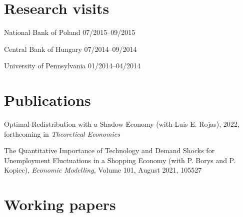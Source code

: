 \documentclass[letterpaper]{article}
\renewenvironment{itemize}{
  \begin{list}{}{
    \setlength{\leftmargin}{1.5em}
  }
}{
  \end{list}
}
\begin{document}
\section*{Research visits}

\begin{itemize}
  \item National Bank of Poland \hfill  07/2015--09/2015
  \item Central Bank of Hungary \hfill  07/2014--09/2014
  \item University of Pennsylvania \hfill  01/2014--04/2014
\end{itemize}


  



\section*{Publications}

\begin{itemize}
\item Optimal Redistribution with a Shadow Economy (with Luis E. Rojas), 2022, forthcoming in \textit{Theoretical Economics}
\item The Quantitative Importance of Technology and Demand Shocks for Unemployment Fluctuations in a Shopping Economy (with P. Borys and P. Kopiec), \textit{Economic Modelling}, Volume 101, August 2021, 105527
\end{itemize}

\section*{Working papers}

\end{document}
